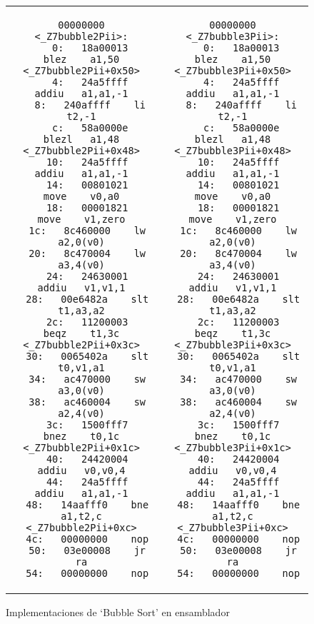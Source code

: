 \begin{figure}
\begin{center}
\begin{tabular}{c c}
	\begin{minipage}[t]{.5\textwidth}
		\begin{lstlisting}[caption=bubble2, basicstyle=\ttfamily\scriptsize, tabsize=2]
00000000 <_Z7bubble2Pii>:
   0:	18a00013 	blez	a1,50 <_Z7bubble2Pii+0x50>
   4:	24a5ffff 	addiu	a1,a1,-1
   8:	240affff 	li	t2,-1
   c:	58a0000e 	blezl	a1,48 <_Z7bubble2Pii+0x48>
  10:	24a5ffff 	addiu	a1,a1,-1
  14:	00801021 	move	v0,a0
  18:	00001821 	move	v1,zero
  1c:	8c460000 	lw	a2,0(v0)
  20:	8c470004 	lw	a3,4(v0)
  24:	24630001 	addiu	v1,v1,1
  28:	00e6482a 	slt	t1,a3,a2
  2c:	11200003 	beqz	t1,3c <_Z7bubble2Pii+0x3c>
  30:	0065402a 	slt	t0,v1,a1
  34:	ac470000 	sw	a3,0(v0)
  38:	ac460004 	sw	a2,4(v0)
  3c:	1500fff7 	bnez	t0,1c <_Z7bubble2Pii+0x1c>
  40:	24420004 	addiu	v0,v0,4
  44:	24a5ffff 	addiu	a1,a1,-1
  48:	14aafff0 	bne	a1,t2,c <_Z7bubble2Pii+0xc>
  4c:	00000000 	nop
  50:	03e00008 	jr	ra
  54:	00000000 	nop
		\end{lstlisting}
	\end{minipage}
	&
	\begin{minipage}[t]{.5\textwidth}
		\begin{lstlisting}[caption=bubble3, basicstyle=\ttfamily\scriptsize, tabsize=2]
00000000 <_Z7bubble3Pii>:
   0:	18a00013 	blez	a1,50 <_Z7bubble3Pii+0x50>
   4:	24a5ffff 	addiu	a1,a1,-1
   8:	240affff 	li	t2,-1
   c:	58a0000e 	blezl	a1,48 <_Z7bubble3Pii+0x48>
  10:	24a5ffff 	addiu	a1,a1,-1
  14:	00801021 	move	v0,a0
  18:	00001821 	move	v1,zero
  1c:	8c460000 	lw	a2,0(v0)
  20:	8c470004 	lw	a3,4(v0)
  24:	24630001 	addiu	v1,v1,1
  28:	00e6482a 	slt	t1,a3,a2
  2c:	11200003 	beqz	t1,3c <_Z7bubble3Pii+0x3c>
  30:	0065402a 	slt	t0,v1,a1
  34:	ac470000 	sw	a3,0(v0)
  38:	ac460004 	sw	a2,4(v0)
  3c:	1500fff7 	bnez	t0,1c <_Z7bubble3Pii+0x1c>
  40:	24420004 	addiu	v0,v0,4
  44:	24a5ffff 	addiu	a1,a1,-1
  48:	14aafff0 	bne	a1,t2,c <_Z7bubble3Pii+0xc>
  4c:	00000000 	nop
  50:	03e00008 	jr	ra
  54:	00000000 	nop
		\end{lstlisting}
	\end{minipage} \\
\end{tabular}
\label{bubble}
\end{center}
\caption{Implementaciones de `Bubble Sort' en ensamblador}
\end{figure}


